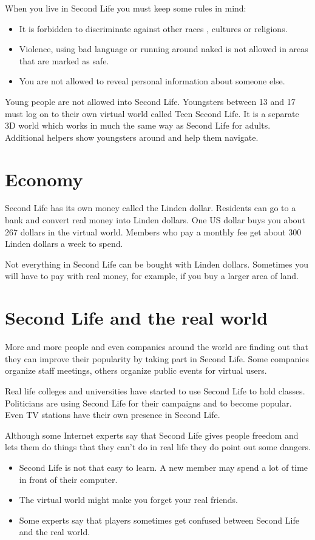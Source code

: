 \documentclass[a4paper,twocolumn]{article}
\begin{document}
When you live in Second Life you must keep some rules in mind:
\begin{itemize}
\item  It is forbidden to discriminate against other races , cultures or
religions.
\item   Violence, using bad language or running around naked is not
allowed in areas that are marked as safe.
\item  You are not allowed to reveal personal information about someone
else.
\end{itemize}
Young people are not allowed into Second Life. Youngsters between 13
and 17 must log on to their own virtual world called Teen Second Life.
It is a separate 3D world which works in much the same way as Second
Life for adults. Additional helpers show youngsters around and help them
navigate. 

\section{Economy}

Second Life has its own money called the Linden dollar. Residents can go
to a bank and convert real money into Linden dollars. One US dollar buys
you about 267 dollars in the virtual world. Members who pay a monthly
fee get about 300 Linden dollars a week to spend.

Not everything in Second Life can be bought with Linden dollars.
Sometimes you will have to pay with real money, for example, if you buy
a larger area of land.

\section{Second Life and the real world}

More and more people and even companies around the world are finding out
that they can improve their popularity by taking part in Second Life.
Some companies organize staff meetings, others organize public events
for virtual users.

Real life colleges and universities have started to use Second Life to
hold classes. Politicians are using Second Life for their campaigns and
to become popular. Even TV stations have their own presence in Second
Life.   

Although some Internet experts say that Second Life gives people freedom
and lets them do things that they can’t do in real life they do point
out some dangers.

\begin{itemize}
\item  Second Life is not that easy to learn. A new member may spend 
a lot of time in front of their computer.
\item   The virtual world might make you forget your real friends.
\item   Some experts say that players sometimes get confused between 
Second Life and the real world.
\end{itemize}
\end{document}
